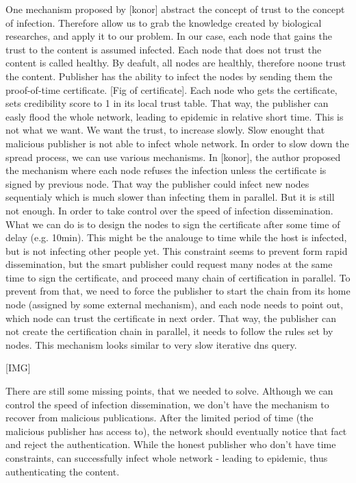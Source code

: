 \documentclass[nostrict]{szablonPG}
\begin{document}
One mechanism proposed by [konor] abstract the concept of trust to the concept of infection. Therefore allow us to grab the knowledge created by biological researches, and apply it to our problem. In our case, each node that gains the trust to the content is assumed infected. Each node that does not trust the content is called healthy. By deafult, all nodes are healthly, therefore noone trust the content.
Publisher has the ability to infect the nodes by sending them the proof-of-time certificate. [Fig of certificate].
Each node who gets the certificate, sets credibility score to 1 in its local trust table. That way, the publisher can easly flood the whole network, leading to epidemic in relative short time.  This is not what we want. We want the trust, to increase slowly. Slow enought that malicious publisher is not able to infect whole network. In order to slow down the spread process, we can use various mechanisms. In [konor], the author proposed the mechanism where each node refuses the infection unless the certificate is signed by previous node. That way the publisher could infect new nodes sequentialy which is much slower than infecting them in parallel. But it is still not enough. In order to take control over the speed of infection dissemination. What we can do is to design the nodes to sign the certificate after some time of delay (e.g. 10min). This might be the analouge to time while the host is infected, but is not infecting other people yet. This constraint seems to prevent form rapid dissemination, but the smart publisher could request many nodes at the same time to sign the certificate, and proceed many chain of certification in parallel. To prevent from that, we need to force the publisher to start the chain from its home node (assigned by some external mechanism), and each node needs to point out, which node can trust the certificate in next order. That way, the publisher can not create the certification chain in parallel, it needs to follow the rules set by nodes. This mechanism looks similar to very slow iterative dns query.

[IMG]

There are still some missing points, that we needed to solve. Although we can control the speed of infection dissemination, we don't have the mechanism to recover from malicious publications.  After the limited period of time (the malicious publisher has access to), the network should eventually notice that fact and reject the authentication. While the honest publisher who don't have time constraints, can successfully infect whole network - leading to epidemic, thus authenticating the content. 
\end{document}
